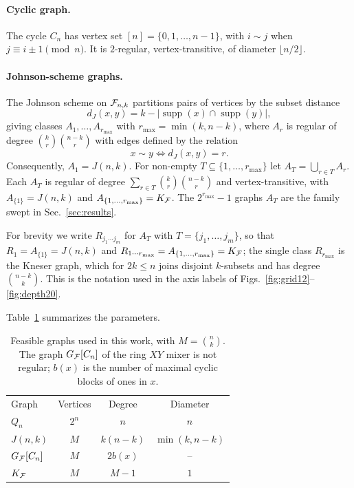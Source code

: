 \paragraph*{Cyclic graph.} The cycle $C_n$ has vertex set $ [n] = \{0,1,\dots,n-1\}$, with
$i\sim j$ when $j\equiv i\pm1\pmod n$. It is $2$-regular,
vertex-transitive, of diameter $\lfloor n/2\rfloor$.

\paragraph*{Johnson-scheme graphs.} The Johnson scheme on $\mathcal{F}_{n,k}$
partitions pairs of vertices by the subset distance
\begin{equation}
    d_J(x,y)=k-|\operatorname{supp}(x)\cap\operatorname{supp}(y)| ,
    \label{eq:johnson-distance}
\end{equation}
giving classes $A_1,\dots,A_{r_{\max}}$ with $r_{\max}=\min(k,n-k)$, where
$A_r$ is regular of degree $\binom{k}{r}\binom{n-k}{r}$ with edges defined by the relation 
\begin{equation}
  x \sim y \iff d_J(x,y) = r.
\end{equation}
 Consequently, $A_1=J(n,k)$. For
non-empty $T\subseteq\{1,\dots,r_{\max}\}$ let $A_T=\bigcup_{r\in T}A_r$.
Each $A_T$ is regular of degree $\sum_{r\in T}\binom{k}{r}\binom{n-k}{r}$
and vertex-transitive, with $A_{\{1\}}=J(n,k)$ and
$A_{\{1,\dots,r_{\max}\}}=K_{\mathcal{F}}$. The $2^{r_{\max}}-1$
graphs $A_T$ are the family swept in Sec.~\ref{sec:results}.

For brevity we write $R_{j_1\cdots j_m}$ for $A_T$ with
$T=\{j_1,\dots,j_m\}$, so that $R_1=A_{\{1\}}=J(n,k)$ and
$R_{1\cdots r_{\max}}=A_{\{1,\dots,r_{\max}\}}=K_{\mathcal{F}}$; the single class
$R_{r_{\max}}$ is the Kneser graph, which for $2k\le n$ joins disjoint
$k$-subsets and has degree $\binom{n-k}{k}$. This is the notation used in
the axis labels of Figs.~\ref{fig:grid12}--\ref{fig:depth20}.

Table~\ref{tab:graph-zoo} summarizes the parameters.

\begin{table}[b]
\caption{\label{tab:graph-zoo}Feasible graphs used in this work, with
$M=\binom{n}{k}$. The graph $G_{\mathcal{F}}[C_n]$ of the ring $XY$ mixer is not
regular; $b(x)$ is the number of maximal cyclic blocks of ones in $x$.}
\begin{ruledtabular}
\begin{tabular}{lccc}
Graph & Vertices & Degree & Diameter \\
\colrule
$Q_n$ & $2^n$ & $n$ & $n$ \\
$J(n,k)$ & $M$ & $k(n-k)$ & $\min(k,n-k)$ \\
$G_{\mathcal{F}}[C_n]$ & $M$ & $2b(x)$ & -- \\ %
$K_{\mathcal{F}}$ & $M$ & $M-1$ & $1$ \\
\end{tabular}
\end{ruledtabular}
\end{table}

